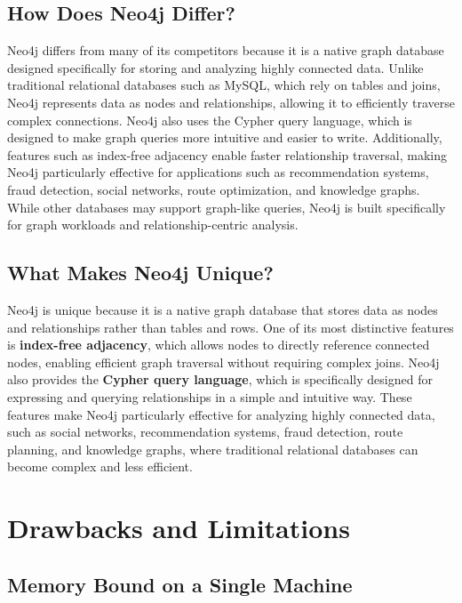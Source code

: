 \documentclass[11pt,a4paper]{article}
\begin{document}
\subsection{How Does Neo4j Differ?}

Neo4j differs from many of its competitors because it is a native graph database designed specifically for storing and analyzing highly connected data. Unlike traditional relational databases such as MySQL, which rely on tables and joins, Neo4j represents data as nodes and relationships, allowing it to efficiently traverse complex connections. Neo4j also uses the Cypher query language, which is designed to make graph queries more intuitive and easier to write. Additionally, features such as index-free adjacency enable faster relationship traversal, making Neo4j particularly effective for applications such as recommendation systems, fraud detection, social networks, route optimization, and knowledge graphs. While other databases may support graph-like queries, Neo4j is built specifically for graph workloads and relationship-centric analysis.

\subsection{What Makes Neo4j Unique?}

Neo4j is unique because it is a native graph database that stores data as nodes and relationships rather than tables and rows. One of its most distinctive features is \textbf{index-free adjacency}, which allows nodes to directly reference connected nodes, enabling efficient graph traversal without requiring complex joins. Neo4j also provides the \textbf{Cypher query language}, which is specifically designed for expressing and querying relationships in a simple and intuitive way. These features make Neo4j particularly effective for analyzing highly connected data, such as social networks, recommendation systems, fraud detection, route planning, and knowledge graphs, where traditional relational databases can become complex and less efficient.

\section{Drawbacks and Limitations}

\subsection{Memory Bound on a Single Machine}
\end{document}
